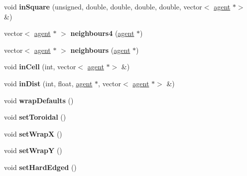 \begin{DoxyCompactItemize}
\item 
\mbox{\label{classsearchGrid_a7592f935d933f0554626e1fbb5afae35}} 
void {\bfseries in\+Square} (unsigned, double, double, double, double, vector$<$ \mbox{\hyperlink{classagent}{agent}} $\ast$$>$ \&)
\item 
\mbox{\label{classsearchGrid_a8e57ece6343c3a2671670dd1e1f7656b}} 
vector$<$ \mbox{\hyperlink{classagent}{agent}} $\ast$ $>$ {\bfseries neighbours4} (\mbox{\hyperlink{classagent}{agent}} $\ast$)
\item 
\mbox{\label{classsearchGrid_ad87996d5112f98ed4be35527adffe48f}} 
vector$<$ \mbox{\hyperlink{classagent}{agent}} $\ast$ $>$ {\bfseries neighbours} (\mbox{\hyperlink{classagent}{agent}} $\ast$)
\item 
\mbox{\label{classsearchGrid_ae7c79d583f544a9a3a25876c91ef8b0e}} 
void {\bfseries in\+Cell} (int, vector$<$ \mbox{\hyperlink{classagent}{agent}} $\ast$$>$ \&)
\item 
\mbox{\label{classsearchGrid_adbeb6c7d74d58cb5a3b524e031ddd67a}} 
void {\bfseries in\+Dist} (int, float, \mbox{\hyperlink{classagent}{agent}} $\ast$, vector$<$ \mbox{\hyperlink{classagent}{agent}} $\ast$$>$ \&)
\item 
\mbox{\label{classsearchGrid_ae0230d99ebe10057f8d68d4ee493ad7c}} 
void {\bfseries wrap\+Defaults} ()
\item 
\mbox{\label{classsearchGrid_aa52dec523a80080bc41896f95ee1cda7}} 
void {\bfseries set\+Toroidal} ()
\item 
\mbox{\label{classsearchGrid_add3e2c63256224cd8cb60e67146d6c9e}} 
void {\bfseries set\+WrapX} ()
\item 
\mbox{\label{classsearchGrid_ab2f7ffa1bade8bef49b309fe9c712f7a}} 
void {\bfseries set\+WrapY} ()
\item 
\mbox{\label{classsearchGrid_a962c2bc9e5faa1de1f93f97f9bff73f2}} 
void {\bfseries set\+Hard\+Edged} ()
\item 
$$
\end{DoxyCompactItemize}
